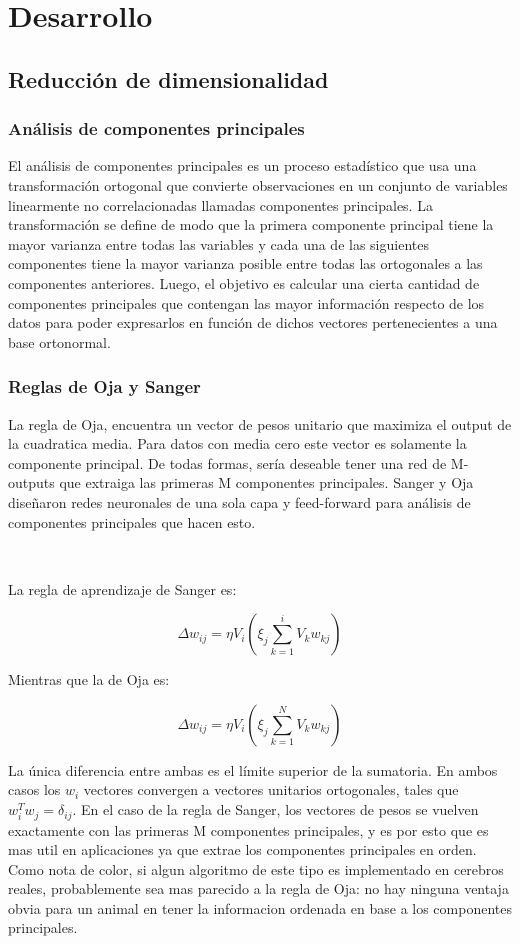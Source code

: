\documentclass[informe.tex]{subfiles}
\begin{document}
  
  \section{Desarrollo}
    \subsection{Reducción de dimensionalidad}
      \subsubsection{Análisis de componentes principales}
	El an\'alisis de componentes principales es un proceso estadístico que usa una transformaci\'on ortogonal que convierte observaciones en un conjunto de variables linearmente no correlacionadas llamadas componentes principales. La transformación se define de modo que la primera componente principal tiene la mayor varianza entre todas las variables y cada una de las siguientes componentes tiene la mayor varianza posible entre todas las ortogonales a las componentes anteriores. Luego, el objetivo es calcular una cierta cantidad de componentes principales que contengan las mayor información respecto de los datos para poder expresarlos en función de dichos vectores pertenecientes a una base ortonormal.
      
      \subsubsection{Reglas de Oja y Sanger}
	La regla de Oja, encuentra un vector de pesos unitario que maximiza el output de la cuadratica media. Para datos con media cero este vector es solamente la componente principal. De todas formas, sería deseable tener una red de M-outputs que extraiga las primeras M componentes principales. Sanger y Oja diseñaron redes neuronales de una sola capa y feed-forward para análisis de componentes principales que hacen esto.
	
	~
	
	La regla de aprendizaje de Sanger es:

	$$\Delta w_{ij} = \eta V_i(\xi_j \sum_{k=1}^{i} V_k w_{kj} )$$

	Mientras que la de Oja es:

	$$\Delta w_{ij} = \eta V_i(\xi_j \sum_{k=1}^{N} V_k w_{kj} )$$

	La única diferencia entre ambas es el límite superior de la sumatoria. En ambos casos los $w_i$ vectores convergen a vectores unitarios ortogonales, tales que $w^{T}_i w_j = \delta_{ij}$. En el caso de la regla de Sanger, los vectores de pesos se vuelven exactamente con las primeras M componentes principales, y es por esto que es mas util en aplicaciones ya que extrae los componentes principales en orden. Como nota de color, si algun algoritmo de este tipo es implementado en cerebros reales, probablemente sea mas parecido a la regla de Oja: no hay ninguna ventaja obvia para un animal en tener la informacion ordenada en base a los componentes principales. 
\end{document}
